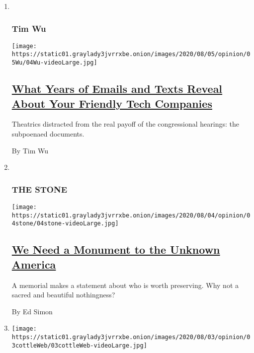 \begin{enumerate}
\def\labelenumi{\arabic{enumi}.}
\item ~
  \hypertarget{tim-wu}{%
  \subsubsection{Tim Wu}\label{tim-wu}}

  \texttt{[image: https://static01.graylady3jvrrxbe.onion/images/2020/08/05/opinion/05Wu/04Wu-videoLarge.jpg]}

  \hypertarget{what-years-of-emails-and-texts-reveal-about-your-friendly-tech-companies}{%
  \subsection{\texorpdfstring{\href{/2020/08/04/opinion/amazon-facebook-congressional-hearings.html}{What
  Years of Emails and Texts Reveal About Your Friendly Tech
  Companies}}{What Years of Emails and Texts Reveal About Your Friendly Tech Companies}}\label{what-years-of-emails-and-texts-reveal-about-your-friendly-tech-companies}}

  Theatrics distracted from the real payoff of the congressional
  hearings: the subpoenaed documents.

  By Tim Wu
\item ~
  \hypertarget{the-stone}{%
  \subsubsection{THE STONE}\label{the-stone}}

  \texttt{[image: https://static01.graylady3jvrrxbe.onion/images/2020/08/04/opinion/04stone/04stone-videoLarge.jpg]}

  \hypertarget{we-need-a-monument-to-the-unknown-america}{%
  \subsection{\texorpdfstring{\href{/2020/08/04/opinion/us-monuments-rome-unknown-god.html}{We
  Need a Monument to the Unknown
  America}}{We Need a Monument to the Unknown America}}\label{we-need-a-monument-to-the-unknown-america}}

  A memorial makes a statement about who is worth preserving. Why not a
  sacred and beautiful nothingness?

  By Ed Simon
\item
  \texttt{[image: https://static01.graylady3jvrrxbe.onion/images/2020/08/03/opinion/03cottleWeb/03cottleWeb-videoLarge.jpg]}


\end{enumerate}
